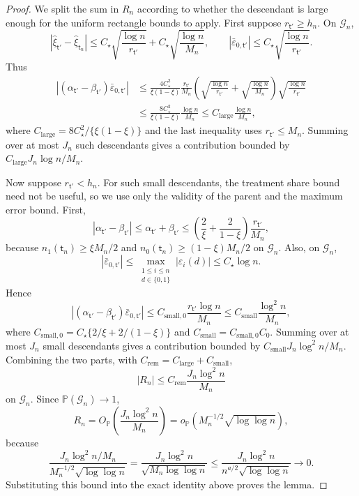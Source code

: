 \documentclass[10pt,a4paper]{amsart}
\def\P{\mathbb{P}}
\def\nodet{\mathsf{t}}
\begin{document}
\begin{proof}
We split the sum in $R_n$ according to whether the descendant is large enough
for the uniform rectangle bounds to apply. First suppose $r_{\nodet'}\geq h_n$.
On $\mathcal G_n$,
\[
    |\hat\xi_{\nodet'}-\hat\xi_{\nodet_n}|
    \leq
    C_\star
    \sqrt{\frac{\log n}{r_{\nodet'}}}
    +
    C_\star
    \sqrt{\frac{\log n}{M_n}},
    \qquad
    |\bar\varepsilon_{0,\nodet'}|
    \leq
    C_\star
    \sqrt{\frac{\log n}{r_{\nodet'}}}.
\]
Thus
\[
\begin{aligned}
    |(\alpha_{\nodet'}-\beta_{\nodet'})
        \bar\varepsilon_{0,\nodet'}|
    &\leq
    \frac{4C_\star^2}{\xi(1-\xi)}
    \frac{r_{\nodet'}}{M_n}
    \left(
        \sqrt{\frac{\log n}{r_{\nodet'}}}
        +
        \sqrt{\frac{\log n}{M_n}}
    \right)
    \sqrt{\frac{\log n}{r_{\nodet'}}}  \\
    &\leq
    \frac{8C_\star^2}{\xi(1-\xi)}
    \frac{\log n}{M_n}
    \leq
    C_{\mathrm{large}}\frac{\log n}{M_n},
\end{aligned}
\]
where $C_{\mathrm{large}}=8C_\star^2/\{\xi(1-\xi)\}$ and the last inequality uses $r_{\nodet'}\leq M_n$. Summing over at most $J_n$ such descendants gives a contribution bounded by $C_{\mathrm{large}}J_n\log n/M_n$.

Now suppose $r_{\nodet'}<h_n$. For such small descendants, the treatment share
bound need not be useful, so we use only the validity of the parent and the
maximum error bound. First,
\[
    |\alpha_{\nodet'}-\beta_{\nodet'}|
    \leq
    \alpha_{\nodet'}+\beta_{\nodet'}
    \leq
    \left(\frac{2}{\xi}+\frac{2}{1-\xi}\right)
    \frac{r_{\nodet'}}{M_n},
\]
because $n_1(\nodet_n)\geq \xi M_n/2$ and $n_0(\nodet_n)\geq (1-\xi)M_n/2$ on $\mathcal G_n$. Also, on $\mathcal G_n$,
\[
    |\bar\varepsilon_{0,\nodet'}|
    \leq
    \max_{\substack{1\leq i\leq n\\ d\in\{0,1\}}}
    |\varepsilon_i(d)|
    \leq
    C_\star
    \log n.
\]
Hence
\[
    |(\alpha_{\nodet'}-\beta_{\nodet'})
        \bar\varepsilon_{0,\nodet'}|
    \leq
    C_{\mathrm{small},0}
    \frac{r_{\nodet'}\log n}{M_n}
    \leq
    C_{\mathrm{small}}
    \frac{\log^2 n}{M_n},
\]
where $C_{\mathrm{small},0}=C_\star\{2/\xi+2/(1-\xi)\}$ and $C_{\mathrm{small}}=C_{\mathrm{small},0}C_0$. Summing over at most $J_n$ small descendants gives a contribution bounded by $C_{\mathrm{small}}J_n\log^2 n/M_n$. Combining the two parts, with $C_{\mathrm{rem}}=C_{\mathrm{large}}+C_{\mathrm{small}}$,
\[
    |R_n|
    \leq
    C_{\mathrm{rem}}
    \frac{J_n\log^2 n}{M_n}
\]
on $\mathcal G_n$. Since $\P(\mathcal G_n)\to1$,
\[
    R_n
    =
    O_\P\!\left(\frac{J_n\log^2 n}{M_n}\right)
    =
    o_\P\!\left(M_n^{-1/2}\sqrt{\log\log n}\right),
\]
because
\[
    \frac{J_n\log^2 n/M_n}
         {M_n^{-1/2}\sqrt{\log\log n}}
    =
    \frac{J_n\log^2 n}{\sqrt{M_n\log\log n}}
    \leq
    \frac{J_n\log^2 n}{n^{a/2}\sqrt{\log\log n}}
    \to0.
\]
Substituting this bound into the exact identity above proves the lemma.
\end{proof}
\end{document}
